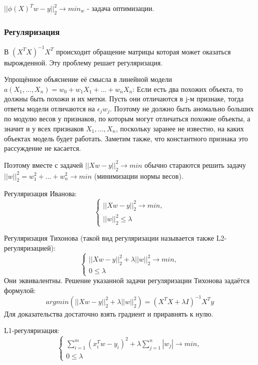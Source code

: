 $||\phi(X)^Tw - y||_2^2 \rightarrow min_w$ - задача оптимизации.

\subsubsection{Регуляризация}
В $(X^TX)^{-1}X^T$ происходит обращение матрицы которая может оказаться вырожденной. Эту проблему решает регуляризация.

Упрощённое объяснение её смысла в линейной модели
$a(X_1, ..., X_n) = w_0 + w_1X_1 + ... + w_nX_n$:
Если есть два похожих объекта, то должны быть похожи и их
метки. Пусть они отличаются в j-м признаке, тогда ответы модели отличаются
на $\epsilon_jw_j$. Поэтому не должно быть аномально больших по модулю весов
у признаков, по которым могут отличаться похожие объекты, а значит и у всех
признаков $X_1, ..., X_n$, поскольку заранее не известно, на каких объектах модель
будет работать. Заметим также, что константного признака это рассуждение не
касается.


Поэтому вместе с задачей
$|| Xw - y ||_2^2 \rightarrow min$
обычно стараются решить задачу
$|| w ||_2^2 = w_1^2 + ... + w_n^2 \rightarrow min$
(минимизации нормы весов).

Регуляризация Иванова:
\begin{equation*}
 \begin{cases}
   || Xw - y ||_2^2 \rightarrow min, 
   \\
   || w ||_2^2 \leq \lambda
 \end{cases}
\end{equation*}

Регуляризация Тихонова (такой вид регуляризации называется также L2-регуляризацией):
\begin{equation*}
 \begin{cases}
   || Xw - y ||_2^2 + \lambda|| w ||_2^2 \rightarrow min, 
   \\
   0 \leq \lambda
\end{cases}
\end{equation*}
Они эквивалентны. Решение указанной задачи регуляризации Тихонова задаётся формулой: 
\begin{equation}\label{ss}
argmin(|| Xw - y ||_2^2 + \lambda|| w ||_2^2) = (X^TX + \lambda I)^{-1}X^Ty
\end{equation}
Для доказательства достаточно взять градиент и приравнять к нулю.

L1-регуляризация:
\begin{equation*}
 \begin{cases}
   \sum\limits_{i=1}^m (x_i^Tw - y_i)^2 + \lambda \sum\limits_{j=1}^n |w_j| \rightarrow min, 
   \\
   0 \leq \lambda
\end{cases}
\end{equation*}

